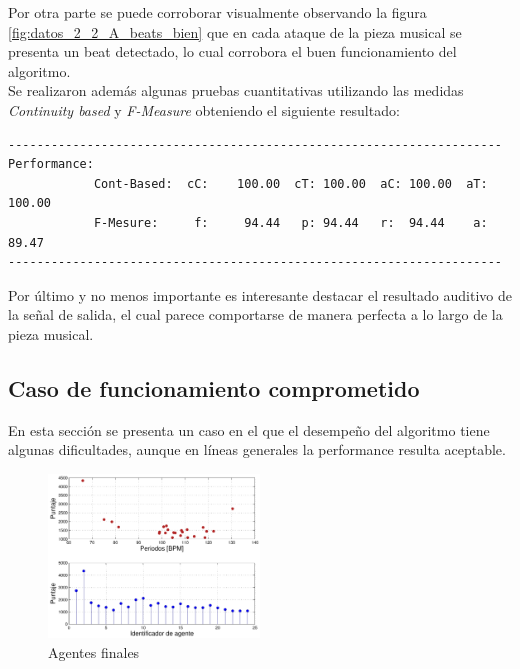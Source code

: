 \documentclass[12pt,a4paper,titlepage]{report}
\begin{document}
Por otra parte se puede corroborar visualmente observando la figura \ref{fig:datos_2_2_A_beats_bien} que en cada ataque de la pieza musical se presenta un beat detectado, lo cual corrobora el buen funcionamiento del algoritmo.\\

Se realizaron además algunas pruebas cuantitativas utilizando las medidas \emph{Continuity based} y \emph{F-Measure} obteniendo el siguiente resultado:

\begin{verbatim}
---------------------------------------------------------------------
Performance:
        	Cont-Based:	 cC:	100.00	cT:	100.00	aC:	100.00	aT:	100.00
        	F-Mesure:     f:	 94.44	 p:	94.44   r:	94.44 	 a:	89.47
---------------------------------------------------------------------
\end{verbatim}

Por último y no menos importante es interesante destacar el resultado auditivo de la señal de salida, el cual parece comportarse de manera perfecta a lo largo de la pieza musical.


\subsection{Caso de funcionamiento comprometido}
\label{sec:andamal}

En esta sección se presenta un caso en el que el desempeño del algoritmo tiene algunas dificultades, aunque en líneas generales la performance resulta aceptable.\\

\begin{figure}
	\vspace{-25pt}
	\begin{center}
	\includegraphics[width=0.5\textwidth]{./pics/datos_2_14_A_agents.pdf}
	\end{center}
	\vspace{-20pt}
	\caption{Agentes finales}
	\label{fig:datos_2_14_A_agents}
	\vspace{-35pt}
\end{figure}
\end{document}
